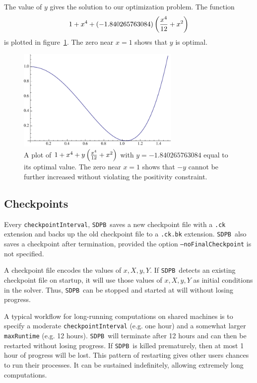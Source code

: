 \documentclass[12pt]{article}
\numberwithin{equation}{section}
\renewcommand{\be}{\begin{eqnarray}}
\renewcommand{\ee}{\end{eqnarray}}
\newcommand\SDPB{\texttt{SDPB}}
\begin{document}
The value of $y$ gives the solution to our optimization problem.  The function
\be
1+x^4 + (-1.840265763084)\p{\frac{x^4}{12} + x^2}
\ee
is plotted in figure~\ref{fig:plot}.  The zero near $x=1$ shows that $y$ is optimal.

\begin{figure}
\begin{center}
\includegraphics[width=0.7\textwidth]{optimizationplot}
\end{center}
\caption{A plot of $1+x^4 + y\left ( \frac{x^4}{12} + x^2 \right )$ with $y=-1.840265763084$ equal to its optimal value.  The zero near $x=1$ shows that $-y$ cannot be further increased without violating the positivity constraint.}
\label{fig:plot}
\end{figure}

\subsection{Checkpoints}

Every \texttt{checkpointInterval}, \SDPB\ saves a new checkpoint file with a \texttt{.ck} extension and backs up the old checkpoint file to a \texttt{.ck.bk} extension.  \SDPB\ also saves a checkpoint after termination, provided the option \texttt{--noFinalCheckpoint} is not specified.  

A checkpoint file encodes the values of $x,X,y,Y$.  If \SDPB\ detects an existing checkpoint file on startup, it will use those values of $x,X,y,Y$ as initial conditions in the solver.  Thus, \SDPB\ can be stopped and started at will without losing progress.

A typical workflow for long-running computations on shared machines is to specify a moderate \texttt{checkpointInterval} (e.g. one hour) and a somewhat larger \texttt{maxRuntime} (e.g. 12 hours).  \SDPB\ will terminate after 12 hours and can then be restarted without losing progress.  If \SDPB\ is killed prematurely, then at most 1 hour of progress will be lost.  This pattern of restarting gives other users chances to run their processes.  It can be sustained indefinitely, allowing extremely long computations.
\end{document}
